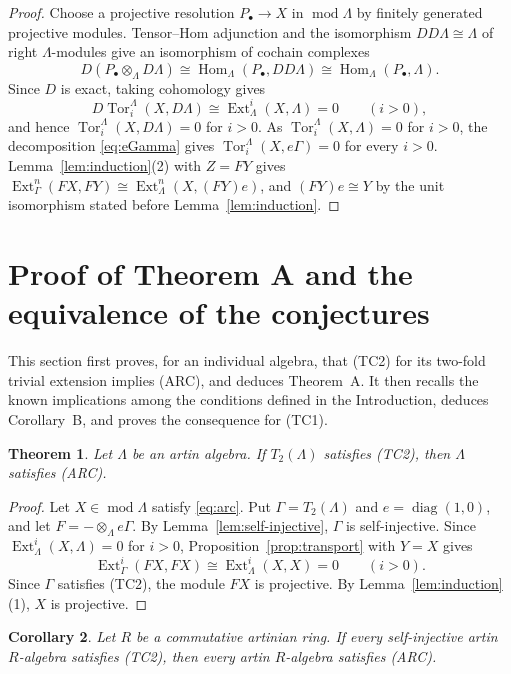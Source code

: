 \documentclass[a4paper,reqno,10pt]{amsart}
\newtheorem{theorem}{Theorem}[section]
\newtheorem{corollary}[theorem]{Corollary}
\theoremstyle{definition}
\numberwithin{equation}{section}
\newcommand{\Hom}{\operatorname{Hom}}
\newcommand{\Ext}{\operatorname{Ext}}
\newcommand{\Tor}{\operatorname{Tor}}
\newcommand{\modu}{\operatorname{mod}}
\newcommand{\ARC}{\textup{(ARC)}}
\newcommand{\TCone}{\textup{(TC1)}}
\newcommand{\TCtwo}{\textup{(TC2)}}
\begin{document}
\begin{proof}
Choose a projective resolution $P_\bullet\to X$ in $\modu\Lambda$ by finitely
generated projective modules.  Tensor--Hom adjunction and the isomorphism
$DD\Lambda\cong\Lambda$ of right $\Lambda$-modules give an isomorphism of
cochain complexes
\[
 D(P_\bullet\otimes_\Lambda D\Lambda)
 \cong\Hom_\Lambda(P_\bullet,DD\Lambda)
 \cong\Hom_\Lambda(P_\bullet,\Lambda).
\]
Since $D$ is exact, taking cohomology gives
\[
 D\Tor_i^\Lambda(X,D\Lambda)\cong\Ext_\Lambda^i(X,\Lambda)=0
 \qquad(i>0),
\]
and hence $\Tor_i^\Lambda(X,D\Lambda)=0$ for $i>0$.  As
$\Tor_i^\Lambda(X,\Lambda)=0$ for $i>0$, the decomposition \eqref{eq:eGamma}
gives $\Tor_i^\Lambda(X,e\Gamma)=0$ for every $i>0$.
Lemma~\ref{lem:induction}(2) with $Z=FY$ gives
$\Ext_\Gamma^n(FX,FY)\cong\Ext_\Lambda^n(X,(FY)e)$, and $(FY)e\cong Y$ by the
unit isomorphism stated before Lemma~\ref{lem:induction}.
\end{proof}

\section{Proof of Theorem A and the equivalence of the conjectures}
\label{sec:consequences}

This section first proves, for an individual algebra, that \TCtwo{} for its
two-fold trivial extension implies \ARC, and deduces Theorem~A.  It then
recalls the known implications among the conditions defined in the
Introduction, deduces Corollary~B, and proves the consequence for \TCone.

\begin{theorem}\label{thm:transfer}
Let $\Lambda$ be an artin algebra.  If $T_2(\Lambda)$ satisfies \TCtwo, then
$\Lambda$ satisfies \ARC.
\end{theorem}

\begin{proof}
Let $X\in\modu\Lambda$ satisfy \eqref{eq:arc}.  Put $\Gamma=T_2(\Lambda)$
and $e=\operatorname{diag}(1,0)$, and let $F=-\otimes_\Lambda e\Gamma$.  By
Lemma~\ref{lem:self-injective}, $\Gamma$ is self-injective.  Since $\Ext_\Lambda^i(X,\Lambda)=0$ for $i>0$,
Proposition~\ref{prop:transport} with $Y=X$ gives
\[
 \Ext_\Gamma^i(FX,FX)\cong\Ext_\Lambda^i(X,X)=0\qquad(i>0).
\]
Since $\Gamma$ satisfies \TCtwo, the module $FX$ is projective.  By
Lemma~\ref{lem:induction}(1), $X$ is projective.
\end{proof}

\begin{corollary}\label{thm:main}
Let $R$ be a commutative artinian ring.  If every self-injective artin
$R$-algebra satisfies \TCtwo, then every artin $R$-algebra satisfies \ARC.
\end{corollary}
\end{document}

